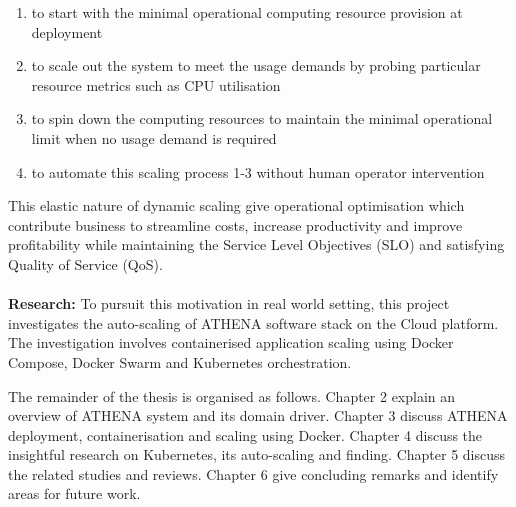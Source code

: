 \begin{enumerate}
\item to start with the minimal operational computing resource provision at deployment
\item to scale out the system to meet the usage demands by probing particular resource metrics such as CPU utilisation
\item to spin down the computing resources to maintain the minimal operational limit when no usage demand is required
\item to automate this scaling process 1-3 without human operator intervention
\end{enumerate}

This elastic nature of dynamic scaling give operational optimisation which contribute business to streamline costs, increase productivity and improve profitability while maintaining the Service Level Objectives (SLO) and satisfying Quality of Service (QoS).
\\
\\
\textbf{Research:} \quad To pursuit this motivation in real world setting, this project investigates the auto-scaling of ATHENA software stack on the Cloud platform. The investigation involves containerised application scaling using Docker Compose, Docker Swarm and Kubernetes orchestration.



The remainder of the thesis is organised as follows. Chapter 2 explain an overview of ATHENA system and its domain driver. Chapter 3 discuss ATHENA deployment, containerisation and scaling using Docker. Chapter 4 discuss the insightful research on Kubernetes, its auto-scaling and finding. Chapter 5 discuss the related studies and reviews. Chapter 6 give concluding remarks and identify areas for future work.

